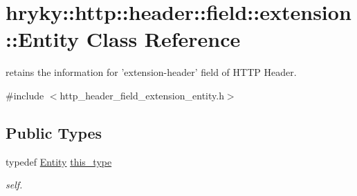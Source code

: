 \hypertarget{classhryky_1_1http_1_1header_1_1field_1_1extension_1_1_entity}{\section{hryky\-:\-:http\-:\-:header\-:\-:field\-:\-:extension\-:\-:Entity Class Reference}
\label{classhryky_1_1http_1_1header_1_1field_1_1extension_1_1_entity}
}


retains the information for 'extension-\/header' field of H\-T\-T\-P Header.  




{\ttfamily \#include $<$http\-\_\-header\-\_\-field\-\_\-extension\-\_\-entity.\-h$>$}

\subsection*{Public Types}
\begin{DoxyCompactItemize}
\item 
\hypertarget{classhryky_1_1http_1_1header_1_1field_1_1extension_1_1_entity_a2bc8ac8159445e7967e97b6ff143e524}{typedef \hyperlink{classhryky_1_1http_1_1header_1_1field_1_1extension_1_1_entity}{Entity} \hyperlink{classhryky_1_1http_1_1header_1_1field_1_1extension_1_1_entity_a2bc8ac8159445e7967e97b6ff143e524}{this\-\_\-type}}\label{classhryky_1_1http_1_1header_1_1field_1_1extension_1_1_entity_a2bc8ac8159445e7967e97b6ff143e524}

\begin{DoxyCompactList}\small\item\em self. \end{DoxyCompactList}\end{DoxyCompactItemize}
